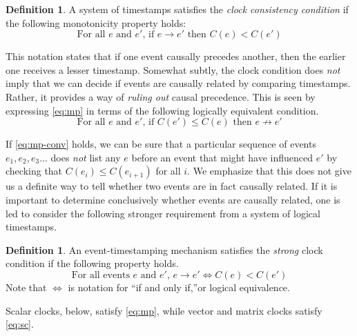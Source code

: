 \documentclass[]             %
{NASA}                       %
\theoremstyle{definition}
\newtheorem{definition}[theorem]{Definition}
\begin{document}
\begin{definition}
  A system of timestamps satisfies the \emph{clock consistency
  condition} if the following monotonicity property holds:
\begin{equation}
  \textrm{For all $e$ and $e'$, if $e \to e'$ then $C(e) < C(e')$} \label{eq:mp}\tag{CC}
\end{equation}
\end{definition}

This notation states that if one event causally precedes another, then
the earlier one receives a lesser timestamp. Somewhat subtly, the
clock condition does \emph{not} imply that we can decide if events are
causally related by comparing timestamps. Rather, it provides a way of
\emph{ruling out} causal precedence. This is seen by expressing
\eqref{eq:mp} in terms of the following logically equivalent
condition.
\begin{equation}
  \textrm{For all $e$ and $e'$, if $C(e') \leq C(e)$ then $e \not\to e'$} \label{eq:mp-conv}\tag{CC$'$}
\end{equation}

If \eqref{eq:mp-conv} holds, we can be sure that a particular sequence
of events $e_1, e_2, e_3\ldots$ does \emph{not} list any $e$ before an
event that might have influenced $e'$ by checking that
$C(e_{i}) \leq C(e_{i+1})$ for all $i$. We emphasize that this does
not give us a definite way to tell whether two events are in fact
causally related. If it is important to determine conclusively whether
events are causally related, one is led to consider the following
stronger requirement from a system of logical timestamps.
\begin{definition}
  An event-timestamping mechanism satisfies the \emph{strong} clock   condition if the following property holds.
  \begin{equation}
    \textrm{For all events $e$ and $e'$, } e \to e' \iff C(e) <
    C(e') \label{eq:sc}\tag{SC}
  \end{equation}
  Note that $\iff$ is notation for ``if and only if,''or logical
  equivalence.
\end{definition}
Scalar clocks, below, satisfy \eqref{eq:mp}, while vector and matrix
clocks satisfy \eqref{eq:sc}.
\end{document}
